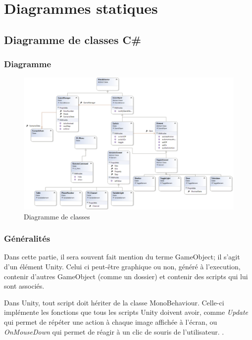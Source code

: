 \section{Diagrammes statiques}

\subsection{Diagramme de classes C\#}

\subsubsection{Diagramme}
\begin{figure}[h]
    \centering
    \includegraphics[width=\textwidth]{4-Conception/img/diagClasses.png}
    \caption{Diagramme de classes}
    \label{fig:class_diagram}
\end{figure}

\subsubsection{Généralités}
Dans cette partie, il sera souvent fait mention du terme GameObject; il s'agit d'un élément Unity. 
Celui ci peut-être graphique ou non, généré à l'execution, contenir d'autres GameObject (comme un dossier) et contenir des scripts qui lui sont associés.\newline

Dans Unity, tout script doit hériter de la classe MonoBehaviour. Celle-ci implémente les fonctions que tous les scripts Unity doivent avoir, comme \textit{Update} qui permet de répéter une action à chaque image affichée à l'écran, ou \textit{OnMouseDown} qui permet de réagir à un clic de souris de l'utilisateur. .\newline

